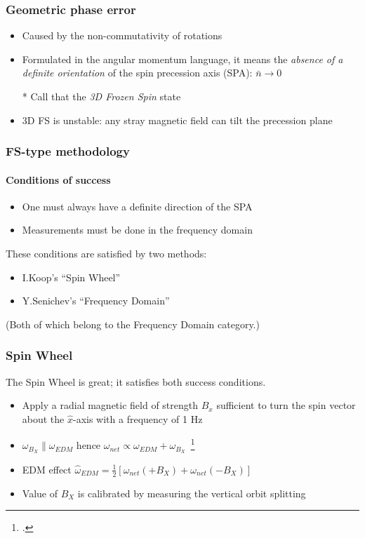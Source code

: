 \documentclass{beamer}
\newcommand{\w}{\omega}
\newcommand{\nbar}{\bar n}
\begin{document}
\begin{frame}\frametitle{Geometric phase error}
  \begin{itemize}
  \item Caused by the non-commutativity of rotations
  \item Formulated in the angular momentum language, it means the \emph{absence of a definite orientation} of
    the spin precession axis (SPA): $\nbar \rightarrow 0$
  \item[*] Call that the \emph{3D Frozen Spin} state
    \item 3D FS is unstable: any stray magnetic field can tilt the precession plane
  \end{itemize}
\end{frame}

\begin{frame}\frametitle{FS-type methodology}\framesubtitle{Conditions of success}
  \begin{itemize}
  \item One must always have a definite direction of the SPA
  \item Measurements must be done in the frequency domain
  \end{itemize}
  These conditions are satisfied by two methods:
  \begin{itemize}
  \item I.Koop's ``Spin Wheel''
  \item Y.Senichev's ``Frequency Domain''
  \end{itemize}
  (Both of which belong to the Frequency Domain category.)
\end{frame}

\begin{frame}\frametitle{Spin Wheel}
  The Spin Wheel is great; it satisfies both success conditions.
  \begin{itemize}
  \item Apply a radial magnetic field of strength $B_x$ sufficient to turn the spin vector about
    the $\hat x$-axis with a frequency of 1 Hz
  \item $\w_{B_X} \parallel \w_{EDM}$ hence $\w_{net} \propto \w_{EDM} + \w_{B_X}$~\footcite[p.~6]{Mane:SpinWheel}
  \item EDM effect $\hat\w_{EDM} = \frac12\left[\w_{net}(+B_X) + \w_{net}(-B_X)\right]$
  \item Value of $B_X$ is calibrated by measuring the vertical orbit splitting
  \end{itemize}
\end{frame}
\end{document}
